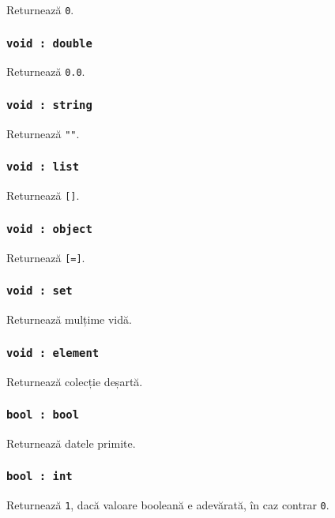 Returnează \lstinline|0|.

\subsubsection{\lstinline|void : double|}

Returnează \lstinline|0.0|.

\subsubsection{\lstinline|void : string|}

Returnează \lstinline|""|.

\subsubsection{\lstinline|void : list|}

Returnează \lstinline|[]|.

\subsubsection{\lstinline|void : object|}

Returnează \lstinline|[=]|.

\subsubsection{\lstinline|void : set|}

Returnează mulțime vidă.

\subsubsection{\lstinline|void : element|}

Returnează colecție deșartă.

\subsubsection{\lstinline|bool : bool|}

Returnează datele primite.

\subsubsection{\lstinline|bool : int|}

Returnează \lstinline|1|, dacă valoare booleană e adevărată, în caz contrar \lstinline|0|.

